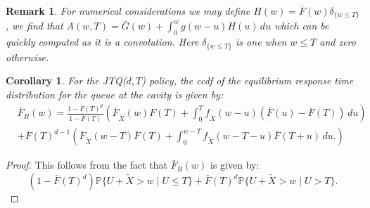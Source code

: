 \documentclass[12pt]{report}
\renewcommand{\P}{\mathbb{P}}
\renewcommand{\P}{\mathbb{P}}
\newtheorem{remark}{Remark}
\newtheorem{corollary}[theorem]{Corollary}
\begin{document}
\begin{remark}
For numerical considerations we may define $H(w) = \bar F(w) \delta_{\{w\leq T\}}$, we find that $A(w,T) = \bar G(w) + \int_0^w g(w-u) H(u)\, du$ which can be quickly computed as it is a convolution. Here $\delta_{\{w\leq T\}}$ is one when $w \leq T$ and zero otherwise.
\end{remark}
\begin{corollary}
For the JTQ($d,T$) policy, the ccdf of the equilibrium response time distribution for the queue at the cavity is given by:
\begin{align*}
& \bar F_R(w)=
\frac{1-\bar F(T)^d}{1-\bar F(T)} \left( \bar F_{\tilde X}(w) F(T) + \int_0^T f_{\tilde{X}}(w-u) (\bar F(u) - \bar F(T)) \, du \right)\\
&+ \bar F(T)^{d-1} \left( \bar F_{\tilde X}(w-T) \bar F(T) + \int_0^{w-T} f_{\tilde X}(w-T-u) \bar F(T+u) \, du. \right)
\end{align*}
\end{corollary}
\begin{proof}
This follows from the fact that $\bar F_R(w)$ is given by:
$$
(1-\bar F(T)^d) \P \{U+\tilde{X} > w \mid U \leq T\} + \bar F(T)^d \P\{U+\tilde X > w\mid U>T\}.
$$
\end{proof}
\end{document}
